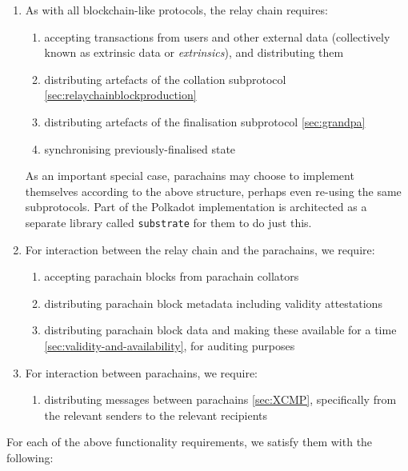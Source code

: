 \documentclass{article}
\begin{document}
\begin{enumerate}
	
	\item As with all blockchain-like protocols, the relay chain requires:
	\begin{enumerate}
		\item accepting transactions from users and other external data (collectively known as extrinsic data or \emph{extrinsics}), and distributing them
		\item distributing artefacts of the collation subprotocol \ref{sec:relaychainblockproduction}
		\item distributing artefacts of the finalisation subprotocol \ref{sec:grandpa}
		\item synchronising previously-finalised state
	\end{enumerate}
	
	As an important special case, parachains may choose to implement themselves
	according to the above structure, perhaps even re-using the same subprotocols.
	Part of the Polkadot implementation is architected as a separate library called
	\texttt{substrate} for them to do just this.
	
	\item For interaction between the relay chain and the parachains, we require:
	\begin{enumerate}
		\item accepting parachain blocks from parachain collators
		\item distributing parachain block metadata including validity attestations
		\item distributing parachain block data and making these available for a time \ref{sec:validity-and-availability}, for auditing purposes
	\end{enumerate}
	
	\item For interaction between parachains, we require:
	\begin{enumerate}
		\item distributing messages between parachains \ref{sec:XCMP}, specifically from the relevant senders to the relevant recipients
	\end{enumerate}
\end{enumerate}

For each of the above functionality requirements, we satisfy them with the
following:
\end{document}
